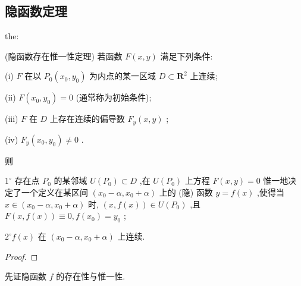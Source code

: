 \subsection{隐函数定理}

\begin{theorem}{}{the:}

\end{theorem}
 (隐函数存在惟一性定理) 若函数 \(F\left( {x,y}\right)\) 满足下列条件:

(i) \(F\) 在以 \({P}_{0}\left( {{x}_{0},{y}_{0}}\right)\) 为内点的某一区域 \(D \subset  {\mathbf{R}}^{2}\) 上连续;

(ii) \(F\left( {{x}_{0},{y}_{0}}\right)  = 0\) (通常称为初始条件);

(iii) \(F\) 在 \(D\) 上存在连续的偏导数 \({F}_{y}\left( {x,y}\right)\) ;

(iv) \({F}_{y}\left( {{x}_{0},{y}_{0}}\right)  \neq  0\) .

则

\({1}^{ \circ  }\) 存在点 \({P}_{0}\) 的某邻域 \(U\left( {P}_{0}\right)  \subset  D\) ,在 \(U\left( {P}_{0}\right)\) 上方程 \(F\left( {x,y}\right)  = 0\) 惟一地决定了一个定义在某区间 \(\left( {{x}_{0} - \alpha ,{x}_{0} + \alpha }\right)\) 上的 (隐) 函数 \(y = f\left( x\right)\) ,使得当 \(x \in  \left( {{x}_{0} - \alpha ,{x}_{0} + \alpha }\right)\) 时, \(\left( {x,f\left( x\right) }\right)  \in  U\left( {P}_{0}\right)\) ,且 \(F\left( {x,f\left( x\right) }\right)  \equiv  0,f\left( {x}_{0}\right)  = {y}_{0}\) ;

\({2}^{ \circ  }f\left( x\right)\) 在 \(\left( {{x}_{0} - \alpha ,{x}_{0} + \alpha }\right)\) 上连续.

\begin{proof}

\end{proof}
先证隐函数 \(f\) 的存在性与惟一性.

